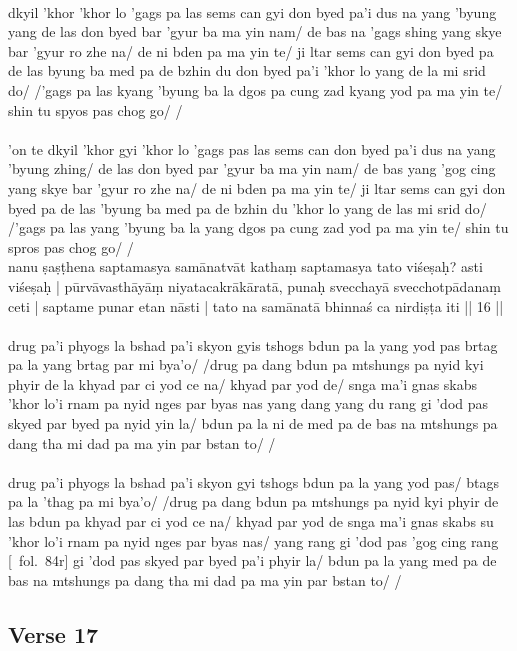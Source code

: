\documentclass[12pt]{article}
\begin{document}
\textbf{\TVA}\\
dkyil 'khor 'khor lo 'gags pa las sems can gyi don byed pa'i dus na yang 'byung yang de las don byed bar 'gyur ba ma yin nam/ de bas na 'gags shing yang skye bar 'gyur ro zhe na/ de ni bden pa ma yin te/ ji ltar sems can gyi don byed pa de las byung ba med pa de bzhin du don byed pa'i 'khor lo yang de la mi srid do/ /'gags pa las kyang 'byung ba la dgos pa cung zad kyang yod pa ma yin te/ shin tu spyos pas chog go/ /\\

\textbf{\TVB}\\
'on te dkyil 'khor gyi 'khor lo 'gags pas las sems can don byed pa'i dus na yang 'byung zhing/ de las don byed par 'gyur ba ma yin nam/ de bas yang 'gog cing yang skye bar 'gyur ro zhe na/ de ni bden pa ma yin te/ ji ltar sems can gyi don byed pa de las 'byung ba med pa de bzhin du 'khor lo yang de las mi srid do/ /'gags pa las yang 'byung ba la yang dgos pa cung zad yod pa ma yin te/ shin tu spros pas chog go/ /\\

nanu ṣaṣṭhena saptamasya samānatvāt kathaṃ saptamasya tato viśeṣaḥ? asti viśeṣaḥ | pūrvāvasthāyāṃ niyatacakrākāratā, punaḥ svecchayā svecchotpādanaṃ ceti | saptame punar etan nāsti | tato na samānatā bhinnaś ca nirdiṣṭa iti || 16 ||\\

\textbf{\TVA}\\
drug pa'i phyogs la bshad pa'i skyon gyis tshogs bdun pa la yang yod pas brtag pa la yang brtag par mi bya'o/ /drug pa dang bdun pa mtshungs pa nyid kyi phyir de la khyad par ci yod ce na/ khyad par yod de/ snga ma'i gnas skabs 'khor lo'i rnam pa nyid nges par byas nas yang dang yang du rang gi 'dod pas skyed par byed pa nyid yin la/ bdun pa la ni de med pa de bas na mtshungs pa dang tha mi dad pa ma yin par bstan to/ /\\

\textbf{\TVB}\\
drug pa'i phyogs la bshad pa'i skyon gyi tshogs bdun pa la yang yod pas/ btags pa la 'thag pa mi bya'o/ /drug pa dang bdun pa mtshungs pa nyid kyi phyir de las bdun pa khyad par ci yod ce na/ khyad par yod de snga ma'i gnas skabs su 'khor lo'i rnam pa nyid nges par byas nas/ yang rang gi 'dod pas 'gog cing rang [\TVB\ fol.\ 84r] gi 'dod pas skyed par byed pa'i phyir la/ bdun pa la yang med pa de bas na mtshungs pa dang tha mi dad pa ma yin par bstan to/ /

\subsection{Verse 17}
\end{document}
